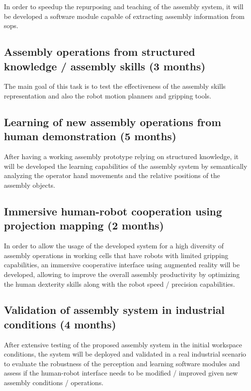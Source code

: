 In order to speedup the repurposing and teaching of the assembly system, it will be developed a software module capable of extracting assembly information from \glspl{sop}.


\subsection{Assembly operations from structured knowledge / assembly skills (3 months)}

The main goal of this task is to test the effectiveness of the assembly skills representation and also the robot motion planners and gripping tools.


\subsection{Learning of new assembly operations from human demonstration (5 months)}

After having a working assembly prototype relying on structured knowledge, it will be developed the learning capabilities of the assembly system by semantically analyzing the operator hand movements and the relative positions of the assembly objects.


\subsection{Immersive human-robot cooperation using projection mapping (2 months)}

In order to allow the usage of the developed system for a high diversity of assembly operations in working cells that have robots with limited gripping capabilities, an immersive cooperative interface using augmented reality will be developed, allowing to improve the overall assembly productivity by optimizing the human dexterity skills along with the robot speed / precision capabilities.


\subsection{Validation of assembly system in industrial conditions (4 months)}

After extensive testing of the proposed assembly system in the initial workspace conditions, the system will be deployed and validated in a real industrial scenario to evaluate the robustness of the perception and learning software modules and assess if the human-robot interface needs to be modified / improved given new assembly conditions / operations.


